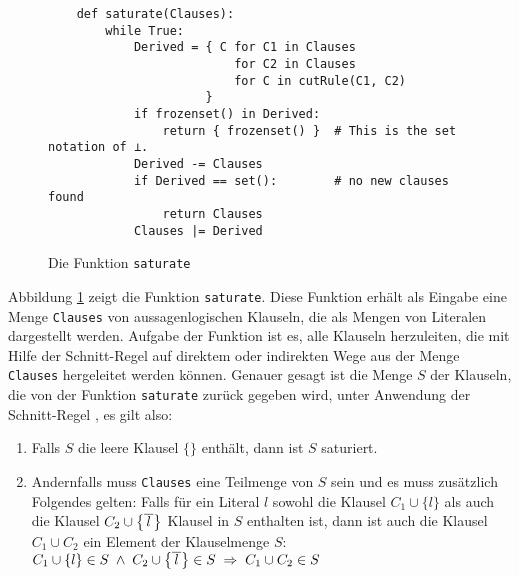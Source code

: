 \begin{figure}[!ht]
\centering
\begin{verbatim}
    def saturate(Clauses):
        while True:
            Derived = { C for C1 in Clauses
                          for C2 in Clauses
                          for C in cutRule(C1, C2)
                      }
            if frozenset() in Derived:
                return { frozenset() }  # This is the set notation of ⊥.
            Derived -= Clauses
            if Derived == set():        # no new clauses found
                return Clauses
            Clauses |= Derived
\end{verbatim}
\vspace*{-0.3cm}
\caption{Die Funktion \texttt{saturate}}
\label{fig:Completeness.ipynb-2}
\end{figure}
    
Abbildung \ref{fig:Completeness.ipynb-2} zeigt die Funktion \texttt{saturate}.  Diese Funktion erhält
als Eingabe eine Menge \texttt{Clauses} von aus\-sagenlogischen Klauseln, die als Mengen von Literalen
dargestellt werden.  Aufgabe der Funktion ist es, alle Klauseln herzuleiten, die mit Hilfe der
Schnitt-Regel auf direktem oder indirekten Wege aus der Menge \texttt{Clauses} hergeleitet werden
können.  Genauer gesagt ist die Menge $S$ der Klauseln, die von der Funktion \texttt{saturate}
zurück gegeben wird, unter Anwendung der Schnitt-Regel , es gilt also:

\begin{enumerate}
\item Falls $S$ die leere Klausel $\{\}$ enthält, dann ist $S$ saturiert.
\item Andernfalls muss \texttt{Clauses} eine Teilmenge von $S$ sein und es muss zusätzlich Folgendes
      gelten: Falls für ein Literal $l$ sowohl die Klausel $C_1 \cup \{ l \}$ als auch die Klausel $C_2 \cup
      \bigl\{ \overline{\,l\,} \bigr\}$ Klausel in $S$
      enthalten ist, dann ist auch die Klausel $C_1 \cup C_2$ ein Element der Klausel\-menge $S$:
      \\[0.2cm]
      \hspace*{1.3cm}
      $C_1 \cup \{ l \} \in S \;\wedge\; C_2 \cup \bigl\{ \overline{\,l\,} \bigr\} \in S \;\Rightarrow\; C_1 \cup C_2 \in S$ 
\end{enumerate}

